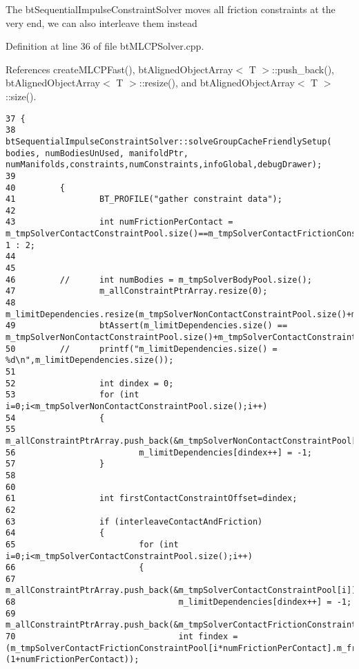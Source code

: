 The btSequentialImpulseConstraintSolver moves all friction constraints at the very end, we can also interleave them instead 

Definition at line 36 of file btMLCPSolver.cpp.

References createMLCPFast(), btAlignedObjectArray$<$ T $>$::push\_\-back(), btAlignedObjectArray$<$ T $>$::resize(), and btAlignedObjectArray$<$ T $>$::size().

\begin{Code}\begin{verbatim}37 {
38         btSequentialImpulseConstraintSolver::solveGroupCacheFriendlySetup( bodies, numBodiesUnUsed, manifoldPtr, numManifolds,constraints,numConstraints,infoGlobal,debugDrawer);
39 
40         {
41                 BT_PROFILE("gather constraint data");
42 
43                 int numFrictionPerContact = m_tmpSolverContactConstraintPool.size()==m_tmpSolverContactFrictionConstraintPool.size()? 1 : 2;
44 
45 
46         //      int numBodies = m_tmpSolverBodyPool.size();
47                 m_allConstraintPtrArray.resize(0);
48                 m_limitDependencies.resize(m_tmpSolverNonContactConstraintPool.size()+m_tmpSolverContactConstraintPool.size()+m_tmpSolverContactFrictionConstraintPool.size());
49                 btAssert(m_limitDependencies.size() == m_tmpSolverNonContactConstraintPool.size()+m_tmpSolverContactConstraintPool.size()+m_tmpSolverContactFrictionConstraintPool.size());
50         //      printf("m_limitDependencies.size() = %d\n",m_limitDependencies.size());
51 
52                 int dindex = 0;
53                 for (int i=0;i<m_tmpSolverNonContactConstraintPool.size();i++)
54                 {
55                         m_allConstraintPtrArray.push_back(&m_tmpSolverNonContactConstraintPool[i]);
56                         m_limitDependencies[dindex++] = -1;
57                 }
58  
60                 
61                 int firstContactConstraintOffset=dindex;
62 
63                 if (interleaveContactAndFriction)
64                 {
65                         for (int i=0;i<m_tmpSolverContactConstraintPool.size();i++)
66                         {
67                                 m_allConstraintPtrArray.push_back(&m_tmpSolverContactConstraintPool[i]);
68                                 m_limitDependencies[dindex++] = -1;
69                                 m_allConstraintPtrArray.push_back(&m_tmpSolverContactFrictionConstraintPool[i*numFrictionPerContact]);
70                                 int findex = (m_tmpSolverContactFrictionConstraintPool[i*numFrictionPerContact].m_frictionIndex*(1+numFrictionPerContact));

\end{verbatim}
\end{Code}
